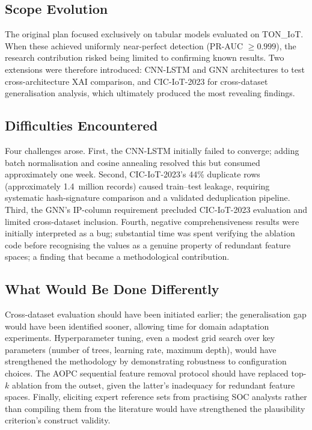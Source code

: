 \documentclass[12pt,a4paper]{report}
\begin{document}
\subsection*{Scope Evolution}

The original plan focused exclusively on tabular models evaluated on TON\_IoT. When these achieved uniformly near-perfect detection (PR-AUC $\geq 0.999$), the research contribution risked being limited to confirming known results. Two extensions were therefore introduced: CNN-LSTM and GNN architectures to test cross-architecture XAI comparison, and CIC-IoT-2023 for cross-dataset generalisation analysis, which ultimately produced the most revealing findings.

\subsection*{Difficulties Encountered}

Four challenges arose. First, the CNN-LSTM initially failed to converge; adding batch normalisation and cosine annealing resolved this but consumed approximately one week. Second, CIC-IoT-2023's 44\% duplicate rows (approximately 1.4~million records) caused train--test leakage, requiring systematic hash-signature comparison and a validated deduplication pipeline. Third, the GNN's IP-column requirement precluded CIC-IoT-2023 evaluation and limited cross-dataset inclusion. Fourth, negative comprehensiveness results were initially interpreted as a bug; substantial time was spent verifying the ablation code before recognising the values as a genuine property of redundant feature spaces; a finding that became a methodological contribution.

\subsection*{What Would Be Done Differently}

Cross-dataset evaluation should have been initiated earlier; the generalisation gap would have been identified sooner, allowing time for domain adaptation experiments. Hyperparameter tuning, even a modest grid search over key parameters (number of trees, learning rate, maximum depth), would have strengthened the methodology by demonstrating robustness to configuration choices. The AOPC sequential feature removal protocol should have replaced top-$k$ ablation from the outset, given the latter's inadequacy for redundant feature spaces. Finally, eliciting expert reference sets from practising SOC analysts rather than compiling them from the literature would have strengthened the plausibility criterion's construct validity.
\end{document}
